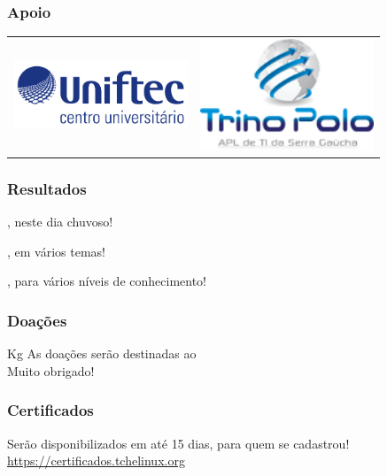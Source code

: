 \begin{frame}
    \frametitle{Apoio}
\begin{center}
\begin{tabular}[h]{cc}
\includegraphics[width=5.2cm]{images/UNIFTEC.png} &
\includegraphics[width=5.2cm]{images/trinopolo.png}
\end{tabular}
\end{center}
\end{frame}

\begin{frame}
    \frametitle{Resultados}

    \begin{description}[labelwidth=\widthof{\bfseries Participantes}]
    \item[Participantes] \participantes, neste dia chuvoso!
    \item[Palestrantes] \palestrantes, em vários temas!
    \item[Palestras] \palestras, para vários níveis de conhecimento!
    \end{description}

\end{frame}

\begin{frame}
    \frametitle{Doações}

    \begin{center}
    \vfill
        \Large \alimentos Kg \normalsize
    \vfill
        As doações serão destinadas ao \\ \Large \textbf{\caridade}
    \vfill
        \normalsize Muito obrigado!
    \vfill
    \end{center}

\end{frame}

\begin{frame}
    \frametitle{Certificados}

\begin{center}
Serão disponibilizados em até 15 dias, para quem se cadastrou!
\vfill
\large \url{https://certificados.tchelinux.org}
\end{center}

\end{frame}




